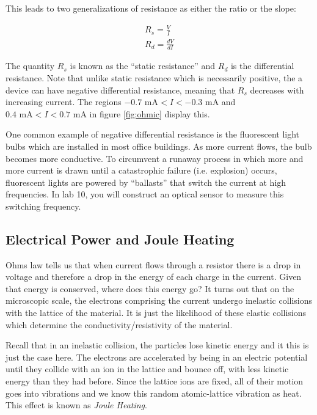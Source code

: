\documentclass{tufte-book}
\begin{document}
This leads to two generalizations of resistance as either the ratio or the slope:

\begin{subequations}
\begin{align}
    R_{s} = \frac{V}{I}\label{eq:genres1}\\
   R_d = \frac{dV}{dI} \label{eq:genres2}
\end{align}
\end{subequations}

The quantity $R_s$ is known as the ``static resistance'' and $R_d$ is the differential resistance. Note that unlike static resistance which is necessarily positive, the a device can have negative differential resistance, meaning that $R_s$ decreases with increasing current. The regions $-0.7\text{ mA}  < I < -0.3\text{ mA}$ and $0.4\text{ mA}  < I < 0.7\text{ mA}$ in figure \ref{fig:ohmic} display this.

One common example of negative differential resistance is the fluorescent light bulbs which are installed in most office buildings. As more current flows, the bulb becomes more conductive. To circumvent a runaway process in which more and more current is drawn until a catastrophic failure (i.e. explosion) occurs, fluorescent lights are powered by ``ballasts'' that switch the current at high frequencies. In lab 10, you will construct an optical sensor to measure this switching frequency.


\subsection{Electrical Power and Joule Heating}
Ohms law tells us that when current flows through a resistor there is a drop in voltage and therefore a drop in the energy of each charge in the current. Given that energy is conserved, where does this energy go? It turns out that on the microscopic scale, the electrons comprising the current undergo inelastic collisions with the lattice of the material. It is just the likelihood of these elastic collisions which determine the conductivity/resistivity of the material. 

Recall that in an inelastic collision, the particles lose kinetic energy and it this is just the case here. The electrons are accelerated by being in an electric potential until they collide with an ion in the lattice and bounce off, with less kinetic energy than they had before. Since the lattice ions are fixed, all of their motion goes into vibrations and we know this random atomic-lattice vibration as heat. This effect is known as \textit{Joule Heating}.
\end{document}
